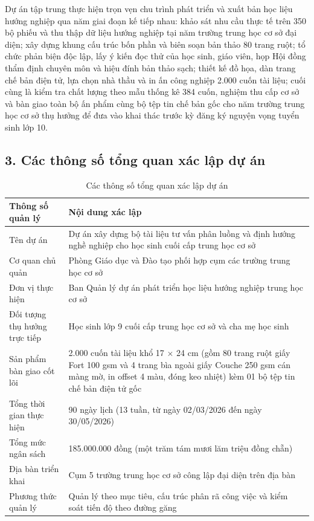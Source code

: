 Dự án tập trung thực hiện trọn vẹn chu trình phát triển và xuất bản học liệu hướng nghiệp qua năm giai đoạn kế tiếp nhau: khảo sát nhu cầu thực tế trên 350 bộ phiếu và thu thập dữ liệu hướng nghiệp tại năm trường trung học cơ sở đại diện; xây dựng khung cấu trúc bốn phần và biên soạn bản thảo 80 trang ruột; tổ chức phản biện độc lập, lấy ý kiến đọc thử của học sinh, giáo viên, họp Hội đồng thẩm định chuyên môn và hiệu đính bản thảo sạch; thiết kế đồ họa, dàn trang chế bản điện tử, lựa chọn nhà thầu và in ấn công nghiệp 2.000 cuốn tài liệu; cuối cùng là kiểm tra chất lượng theo mẫu thống kê 384 cuốn, nghiệm thu cấp cơ sở và bàn giao toàn bộ ấn phẩm cùng bộ tệp tin chế bản gốc cho năm trường trung học cơ sở thụ hưởng để đưa vào khai thác trước kỳ đăng ký nguyện vọng tuyển sinh lớp 10.

\subsection*{3. Các thông số tổng quan xác lập dự án}

\begin{table}[htbp]
\centering
\caption{Các thông số tổng quan xác lập dự án}
\label{tab:thong_so_tong_quan}
\begin{tabularx}{\textwidth}{L{4.2cm}Y}
\toprule
\textbf{Thông số quản lý} & \textbf{Nội dung xác lập} \\
\midrule
Tên dự án & Dự án xây dựng bộ tài liệu tư vấn phân luồng và định hướng nghề nghiệp cho học sinh cuối cấp trung học cơ sở \\
Cơ quan chủ quản & Phòng Giáo dục và Đào tạo phối hợp cụm các trường trung học cơ sở \\
Đơn vị thực hiện & Ban Quản lý dự án phát triển học liệu hướng nghiệp trung học cơ sở \\
Đối tượng thụ hưởng trực tiếp & Học sinh lớp 9 cuối cấp trung học cơ sở và cha mẹ học sinh \\
Sản phẩm bàn giao cốt lõi & 2.000 cuốn tài liệu khổ 17 $\times$ 24 cm (gồm 80 trang ruột giấy Fort 100 gsm và 4 trang bìa ngoài giấy Couche 250 gsm cán màng mờ, in offset 4 màu, đóng keo nhiệt) kèm 01 bộ tệp tin chế bản điện tử gốc \\
Tổng thời gian thực hiện & 90 ngày lịch (13 tuần, từ ngày 02/03/2026 đến ngày 30/05/2026) \\
Tổng mức ngân sách & 185.000.000 đồng (một trăm tám mươi lăm triệu đồng chẵn) \\
Địa bàn triển khai & Cụm 5 trường trung học cơ sở công lập đại diện trên địa bàn \\
Phương thức quản lý & Quản lý theo mục tiêu, cấu trúc phân rã công việc và kiểm soát tiến độ theo đường găng \\
\bottomrule
\end{tabularx}
\end{table}

